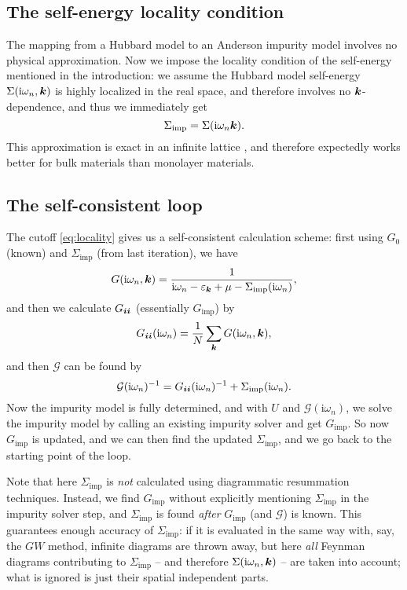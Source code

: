 \documentclass[hyperref, a4paper]{article}
\newcommand*{\ii}{\mathrm{i}}
\begin{document}
\subsection{The self-energy locality condition}

The mapping from a Hubbard model to an Anderson impurity model 
involves no physical approximation.
Now we impose the locality condition of the self-energy mentioned in the introduction:
we assume the Hubbard model self-energy $\Sigma(\ii \omega_n, \vb*{k})$ 
is highly localized in the real space,
and therefore involves no $\vb*{k}$-dependence,
and thus we immediately get 
\begin{equation}
    \Sigma_{\text{imp}} = \Sigma(\ii \omega_n \vb*{k}).
    \label{eq:locality}
\end{equation}
This approximation is exact in an infinite lattice \cite{PhysRevB.45.6479},
and therefore expectedly works better for bulk materials than monolayer materials.

\subsection{The self-consistent loop}

The cutoff \eqref{eq:locality} gives us a self-consistent calculation scheme:
first using $G_0$ (known) and $\Sigma_{\text{imp}}$ (from last iteration), we have 
\begin{equation}
    G(\ii \omega_n, \vb*{k}) = \frac{1}{\ii \omega_n - \varepsilon_{\vb*{k}} + \mu - \Sigma_{\text{imp}}(\ii \omega_n)},
\end{equation}
and then we calculate $G_{\vb*{i} \vb*{i}}$ (essentially $G_{\text{imp}}$) by 
\begin{equation}
    G_{\vb*{i} \vb*{i}}(\ii \omega_n) = \frac{1}{N} \sum_{\vb*{k}} G(\ii \omega_n, \vb*{k}),
\end{equation}
and then $\mathcal{G}$ can be found by 
\begin{equation}
    \mathcal{G}(\ii \omega_n)^{-1} = G_{\vb*{i} \vb*{i}}(\ii \omega_n)^{-1} + \Sigma_{\text{imp}}(\ii \omega_n).
\end{equation}
Now the impurity model is fully determined,
and with $U$ and $\mathcal{G}(\ii \omega_n)$, 
we solve the impurity model by calling an existing impurity solver and get $G_{\text{imp}}$.
So now $G_{\text{imp}}$ is updated,
and we can then find the updated $\Sigma_{\text{imp}}$, 
and we go back to the starting point of the loop.

Note that here $\Sigma_{\text{imp}}$ is \emph{not} calculated 
using diagrammatic resummation techniques.
Instead, we find $G_{\text{imp}}$ without explicitly mentioning $\Sigma_{\text{imp}}$ 
in the impurity solver step, 
and $\Sigma_{\text{imp}}$ is found \emph{after} $G_{\text{imp}}$ (and $\mathcal{G}$) is known.
This guarantees enough accuracy of $\Sigma_{\text{imp}}$:
if it is evaluated in the same way with, say, the $GW$ method,
infinite diagrams are thrown away,
but here \emph{all} Feynman diagrams contributing to $\Sigma_{\text{imp}}$ 
-- and therefore $\Sigma(\ii \omega_n, \vb*{k})$ -- are taken into account;
what is ignored is just their spatial independent parts.
\end{document}
